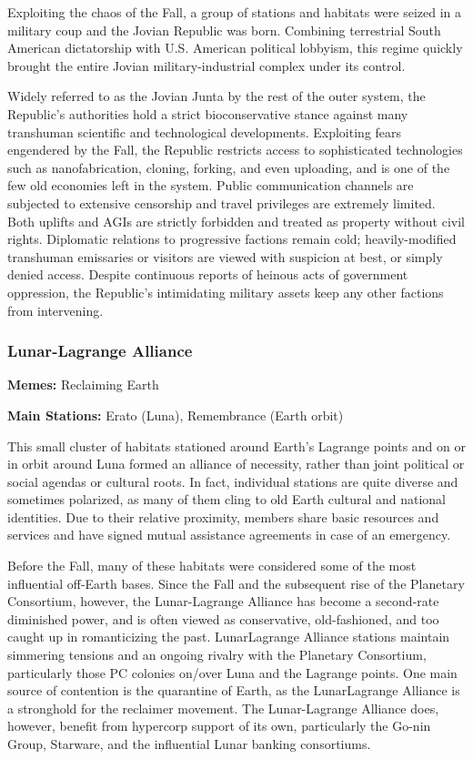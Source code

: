  Exploiting the chaos of the Fall, a group of stations and habitats were seized in a military coup and the Jovian Republic was born. Combining terrestrial South American dictatorship with U.S. American political lobbyism, this regime quickly brought the entire Jovian military-industrial complex under its control. 

Widely referred to as the Jovian Junta by the rest of the outer system, the Republic's authorities hold a strict bioconservative stance against many transhuman scientific and technological developments. Exploiting fears engendered by the Fall, the Republic restricts access to sophisticated technologies such as nanofabrication, cloning, forking, and even uploading, and is one of the few old economies left in the system. Public communication channels are subjected to extensive censorship and travel privileges are extremely limited. Both uplifts and AGIs are strictly forbidden and treated as property without civil rights. Diplomatic relations to progressive factions remain cold; heavily-modified transhuman emissaries or visitors are viewed with suspicion at best, or simply denied access. Despite continuous reports of heinous acts of government oppression, the Republic's intimidating military assets keep any other factions from intervening. 

\subsubsection{Lunar-Lagrange Alliance}
\label{sec:lunar-lagr-alli} 

\textbf{Memes:} Reclaiming Earth 

\textbf{Main Stations:} Erato (Luna), Remembrance (Earth orbit) 

 This small cluster of habitats stationed around Earth's Lagrange points and on or in orbit around Luna formed an alliance of necessity, rather than joint political or social agendas or cultural roots. In fact, individual stations are quite diverse and sometimes polarized, as many of them cling to old Earth cultural and national identities. Due to their relative proximity, members share basic resources and services and have signed mutual assistance agreements in case of an emergency. 

Before the Fall, many of these habitats were considered some of the most influential off-Earth bases. Since the Fall and the subsequent rise of the Planetary Consortium, however, the Lunar-Lagrange Alliance has become a second-rate diminished power, and is often viewed as conservative, old-fashioned, and too caught up in romanticizing the past. LunarLagrange Alliance stations maintain simmering tensions and an ongoing rivalry with the Planetary Consortium, particularly those PC colonies on/over Luna and the Lagrange points. One main source of contention is the quarantine of Earth, as the LunarLagrange Alliance is a stronghold for the reclaimer movement. The Lunar-Lagrange Alliance does, however, benefit from hypercorp support of its own, particularly the Go-nin Group, Starware, and the influential Lunar banking consortiums. 

